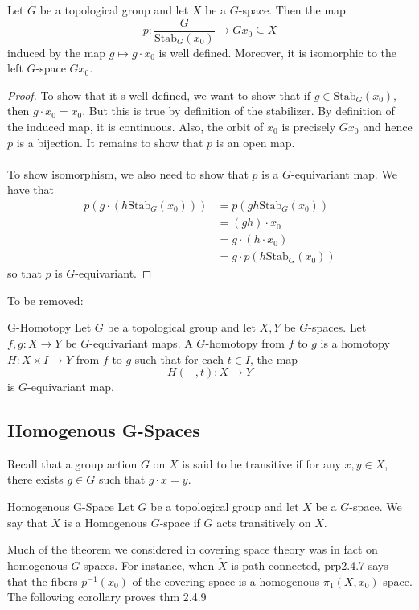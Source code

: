 \documentclass[a4paper]{article}
\begin{document}
\begin{thm}{}{} Let $G$ be a topological group and let $X$ be a $G$-space. Then the map $$p:\frac{G}{\text{Stab}_G(x_0)}\to Gx_0\subseteq X$$ induced by the map $g\mapsto g\cdot x_0$ is well defined. Moreover, it is isomorphic to the left $G$-space $Gx_0$. \tcbline
\begin{proof}
To show that it s well defined, we want to show that if $g\in\text{Stab}_G(x_0)$, then $g\cdot x_0=x_0$. But this is true by definition of the stabilizer. By definition of the induced map, it is continuous. Also, the orbit of $x_0$ is precisely $Gx_0$ and hence $p$ is a bijection. It remains to show that $p$ is an open map. \\~\\

To show isomorphism, we also need to show that $p$ is a $G$-equivariant map. We have that 
\begin{align*}
p(g\cdot(h\text{Stab}_G(x_0)))&=p(gh\text{Stab}_G(x_0))\\
&=(gh)\cdot x_0\\
&=g\cdot(h\cdot x_0)\\
&=g\cdot p(h\text{Stab}_G(x_0))
\end{align*}
so that $p$ is $G$-equivariant. 
\end{proof}
\end{thm}

To be removed:

\begin{defn}{G-Homotopy}{} Let $G$ be a topological group and let $X,Y$ be $G$-spaces. Let $f,g:X\to Y$ be $G$-equivariant maps. A $G$-homotopy from $f$ to $g$ is a homotopy $H:X\times I\to Y$ from $f$ to $g$ such that for each $t\in I$, the map $$H(-,t):X\to Y$$ is $G$-equivariant map. 
\end{defn}

\subsection{Homogenous G-Spaces}
Recall that a group action $G$ on $X$ is said to be transitive if for any $x,y\in X$, there exists $g\in G$ such that $g\cdot x=y$. 

\begin{defn}{Homogenous G-Space}{} Let $G$ be a topological group and let $X$ be a $G$-space. We say that $X$ is a Homogenous $G$-space if $G$ acts transitively on $X$. 
\end{defn}

Much of the theorem we considered in covering space theory was in fact on homogenous $G$-spaces. For instance, when $\tilde{X}$ is path connected, prp2.4.7 says that the fibers $p^{-1}(x_0)$ of the covering space is a homogenous $\pi_1(X,x_0)$-space. The following corollary proves thm 2.4.9
\end{document}
